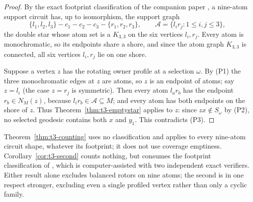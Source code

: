 \begin{proof}
By the exact footprint classification of the companion paper
\cite{Ferudun26supports}, a nine-atom support circuit has, up to
isomorphism, the support graph
\[
 \{l_1,l_2,l_3\}-c_1-c_2-c_3-\{r_1,r_2,r_3\},
 \qquad
 \mathcal A=\{l_ir_j:1\le i,j\le3\},
\]
the double star whose atom set is a \(K_{3,3}\) on the six vertices
\(l_i,r_j\). Every atom is monochromatic, so its endpoints share a
shore, and since the atom graph \(K_{3,3}\) is connected, all six
vertices \(l_i,r_j\) lie on one shore.

Suppose a vertex \(z\) has the rotating owner profile at a selection
\(\omega\). By (P1) the three monochromatic edges at \(z\) are atoms,
so \(z\) is an endpoint of atoms; say \(z=l_i\) (the case \(z=r_j\) is
symmetric). Then every atom \(l_ar_b\) has the endpoint
\(r_b\in N_M(z)\), because \(l_ir_b\in\mathcal A\subseteq M\); and
every atom has both endpoints on the shore of \(z\). Thus
Theorem~\ref{thm:t3-emptystar} applies to \(z\): since
\(zx\notin S_\omega\) by (P2), no selected geodesic contains both
\(x\) and \(y_1\). This contradicts (P3).
\end{proof}

\begin{remark}\label{rem:t3-independent}
Theorem~\ref{thm:t3-counting} uses no classification and applies to
every nine-atom circuit shape, whatever its footprint; it does not use
coverage emptiness. Corollary~\ref{cor:t3-second} counts nothing, but
consumes the footprint classification of \cite{Ferudun26supports},
which is computer-assisted with two independent exact verifiers.
Either result alone excludes balanced rotors on nine atoms; the second
is in one respect stronger, excluding even a single profiled vertex
rather than only a cyclic family.
\end{remark}

